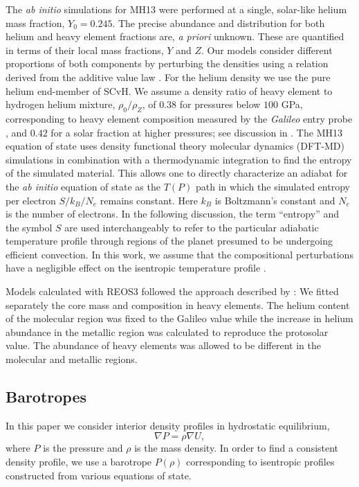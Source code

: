 The \textit{ab initio} simulations for MH13 were performed at a single, solar-like
helium mass fraction, $Y_0=0.245$. The precise abundance and distribution for both
helium and heavy element fractions are, \textit{a priori} unknown.  These are
quantified in terms of their local mass fractions, $Y$ and  $Z$. Our models consider
different proportions of both components by perturbing the densities using a relation
derived from the additive value law \citep{hubbard2016}. For the helium density we
use the pure helium end-member of SCvH. We assume a density ratio of heavy element to
hydrogen helium mixture,  $\rho_0 / \rho_Z$, of  $0.38$ for pressures below $100$
GPa, corresponding to heavy element composition measured by the \textit{Galileo}
entry probe \citep{Wong2004}, and $0.42$ for a solar fraction at higher pressures;
see discussion in \citet{hubbard2016}.  
The MH13 equation of state  uses density functional theory molecular dynamics
(DFT-MD) simulations in combination with a thermodynamic integration to find the
entropy of the simulated material. This allows one to directly characterize an
adiabat for the \textit{ab initio} equation of state as the $T(P)$ path in which the
simulated entropy per electron $S/k_B/N_e$ remains constant.  Here $k_B$ is
Boltzmann's constant and $N_e$ is the number of electrons. In the following
discussion, the term ``entropy'' and the symbol $S$ are used interchangeably to refer
to the particular adiabatic temperature profile through regions of the planet
presumed to be undergoing efficient convection. In this work, we assume that the
compositional perturbations have a negligible effect on the isentropic temperature
profile \citep{Soubiran2016}.



Models calculated with REOS3 followed the approach described by
\citet{miguel2016}: We fitted separately the core mass and composition
in heavy elements. The helium content of the molecular region was
fixed to the Galileo value while the increase in helium abundance in
the metallic region was calculated to reproduce the protosolar
value. The abundance of heavy elements was allowed to be different in
the molecular and metallic regions.   


\subsection{Barotropes} \label{sec:barotropes}
In this paper we consider interior density profiles in hydrostatic equilibrium,
%
\begin{equation} \nabla P = \rho \nabla U,     
    \label{eq:hydrostatic} \end{equation}
%
where $P$ is the pressure and $\rho$ is the mass density. In order to find a consistent
density profile, we use a barotrope $P(\rho)$ corresponding to isentropic profiles
constructed from various equations of state. 

